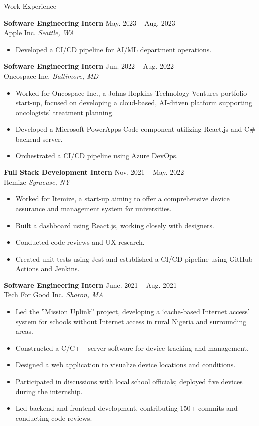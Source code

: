 \documentclass{resume}
\begin{document}
\begin{rSection}{Work Experience}

\textbf{Software Engineering Intern} \hfill May. 2023 – Aug. 2023\\
Apple Inc. \hfill \textit{Seattle, WA}
\begin{itemize}
    \itemsep -5pt {} 
     \item Developed a CI/CD pipeline for AI/ML department operations.
 \end{itemize}
 
\textbf{Software Engineering Intern} \hfill Jun. 2022 – Aug. 2022\\
Oncospace Inc. \hfill \textit{Baltimore, MD}
 \begin{itemize}
    \itemsep -5pt {} 
        \item Worked for Oncospace Inc., a Johns Hopkins Technology Ventures portfolio start-up, focused on developing a cloud-based, AI-driven platform supporting oncologists' treatment planning.
        \item Developed a Microsoft PowerApps Code component utilizing React.js and C$\#$ backend server.
        \item Orchestrated a CI/CD pipeline using Azure DevOps.
 \end{itemize}

 \textbf{Full Stack Development Intern} \hfill Nov. 2021 – May. 2022\\
Itemize \hfill \textit{Syracuse, NY}
  \begin{itemize}
     \itemsep -5pt {} 
         \item Worked for Itemize, a start-up aiming to offer a comprehensive device assurance and management system for universities.
         \item Built a dashboard using React.js, working closely with designers.
         \item Conducted code reviews and UX research.
         \item Created unit tests using Jest and established a CI/CD pipeline using GitHub Actions and Jenkins.
  \end{itemize}

  \textbf{Software Engineering Intern} \hfill June. 2021 – Aug. 2021\\
  Tech For Good Inc. \hfill \textit{Sharon, MA}
    \begin{itemize}
       \itemsep -5pt {} 
           \item Led the ”Mission Uplink” project, developing a `cache-based Internet access' system for schools without Internet access in rural Nigeria and surrounding areas.
           \item Constructed a C/C++ server software for device tracking and management.
           \item Designed a web application to visualize device locations and conditions.
           \item Participated in discussions with local school officials; deployed five devices during the internship.
           \item Led backend and frontend development, contributing 150+ commits and conducting code reviews.
    \end{itemize}



\end{rSection}
\end{document}
